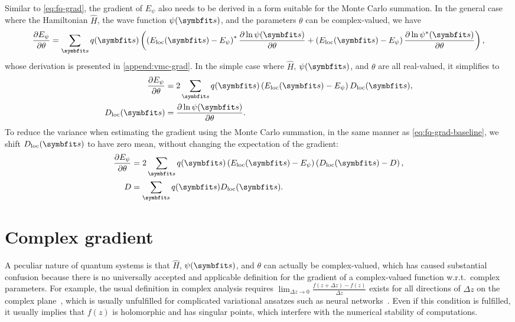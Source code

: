 Similar to \cref{eq:fq-grad}, the gradient of $E_\psi$ also needs to be derived in a form suitable for the Monte Carlo summation. In the general case where the Hamiltonian $\hat{H}$, the wave function $\psi(\vs)$, and the parameters $\theta$ can be complex-valued, we have
\begin{equation}
\frac{\partial E_\psi}{\partial \theta} = \sum_\vs q(\vs) \left( \left( E_\text{loc}(\vs) - E_\psi \right)^* \frac{\partial \ln \psi(\vs)}{\partial \theta} + \left( E_\text{loc}(\vs) - E_\psi \right) \frac{\partial \ln \psi^*(\vs)}{\partial \theta} \right), \label{eq:vmc-grad-cmpl}
\end{equation}
whose derivation is presented in \cref{append:vmc-grad}. In the simple case where $\hat{H}$, $\psi(\vs)$, and $\theta$ are all real-valued, it simplifies to
\begin{align}
\frac{\partial E_\psi}{\partial \theta} &= 2 \sum_\vs q(\vs) \left( E_\text{loc}(\vs) - E_\psi \right) D_\text{loc}(\vs), \label{eq:vmc-grad-real} \\
D_\text{loc}(\vs) &= \frac{\partial \ln \psi(\vs)}{\partial \theta}.
\end{align}
To reduce the variance when estimating the gradient using the Monte Carlo summation, in the same manner as \cref{eq:fq-grad-baseline}, we shift $D_\text{loc}(\vs)$ to have zero mean, without changing the expectation of the gradient:
\begin{align}
\frac{\partial E_\psi}{\partial \theta} &= 2 \sum_\vs q(\vs) \left( E_\text{loc}(\vs) - E_\psi \right) \left( D_\text{loc}(\vs) - D \right), \label{eq:vmc-grad-baseline} \\
D &= \sum_\vs q(\vs) D_\text{loc}(\vs).
\end{align}

\section{Complex gradient}

A peculiar nature of quantum systems is that $\hat{H}$, $\psi(\vs)$, and $\theta$ can actually be complex-valued, which has caused substantial confusion because there is no universally accepted and applicable definition for the gradient of a complex-valued function w.r.t.\ complex parameters. For example, the usual definition in complex analysis requires $\lim_{\Delta z \to 0} \frac{f(z + \Delta z) - f(z)}{\Delta z}$ exists for all directions of $\Delta z$ on the complex plane~\cite{rudin1986real}, which is usually unfulfilled for complicated variational ansatzes such as neural networks~\cite{bassey2021survey}. Even if this condition is fulfilled, it usually implies that $f(z)$ is holomorphic and has singular points, which  interfere with the numerical stability of computations.

